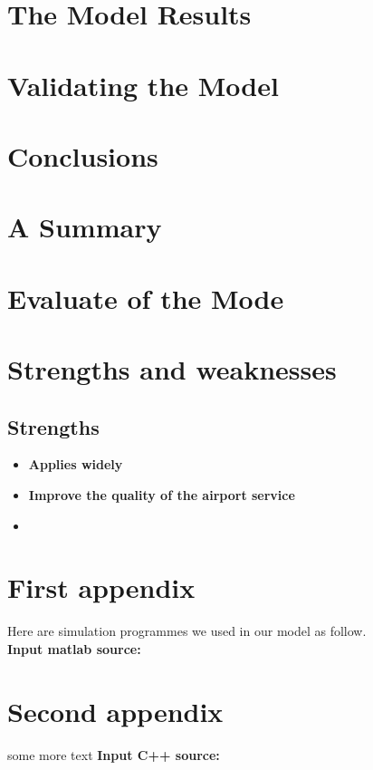 \documentclass{mcmthesis}
\begin{document}
\section{The Model Results}


\section{Validating the Model}


\section{Conclusions}

\section{A Summary}


\section{Evaluate of the Mode}

\section{Strengths and weaknesses}


\subsection{Strengths}
\begin{itemize}
\item \textbf{Applies widely}\\

\item \textbf{Improve the quality of the airport service}\\

\item \textbf{}\\
\end{itemize}


\begin{appendices}

\section{First appendix}


Here are simulation programmes we used in our model as follow.\\

\textbf{\textcolor[rgb]{0.98,0.00,0.00}{Input matlab source:}}


\section{Second appendix}

some more text \textcolor[rgb]{0.98,0.00,0.00}{\textbf{Input C++ source:}}


\end{appendices}

	\nocite{*}



	
\end{document}
